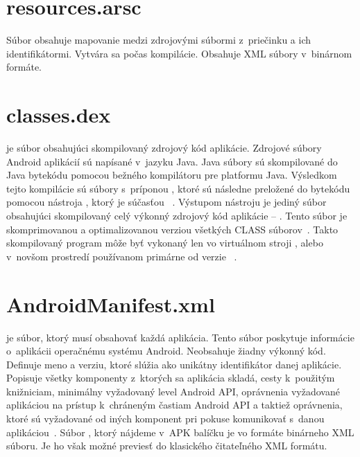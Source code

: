 \section{resources.arsc}
\label{resources.arsc}
Súbor  obsahuje mapovanie medzi zdrojovými súbormi  z~priečinku  a ich identifikátormi.  Vytvára sa počas kompilácie. Obsahuje XML súbory v~binárnom formáte.

\section{classes.dex}
\label{classes.dex}
 je súbor obsahujúci skompilovaný zdrojový kód aplikácie.  Zdrojové súbory Android aplikácií sú napísané v~jazyku Java. Java súbory sú skompilované do Java bytekódu pomocou bežného kompilátoru pre platformu Java. Výsledkom tejto kompilácie sú súbory s~príponou , ktoré sú následne preložené do  bytekódu pomocou nástroja , ktorý je súčasťou ~\cite{Reddy2014}. Výstupom nástroju  je jediný súbor obsahujúci skompilovaný celý výkonný zdrojový kód aplikácie -- . Tento súbor je skomprimovanou a optimalizovanou verziou všetkých CLASS súborov~\cite{Georgiev2014}. Takto skompilovaný program môže byť vykonaný len vo virtuálnom stroji , alebo v~novšom prostredí  používanom primárne od verzie ~\cite{dalvik}.

\section{AndroidManifest.xml} 
\label{AndroidManifest.xml}
 je súbor, ktorý musí obsahovať každá aplikácia. Tento súbor poskytuje informácie o~aplikácii operačnému systému Android. Neobsahuje žiadny výkonný kód. Definuje meno a verziu, ktoré slúžia ako unikátny identifikátor danej aplikácie. Popisuje všetky komponenty z~ktorých sa aplikácia skladá, cesty k~použitým knižniciam, minimálny vyžadovaný level Android API, oprávnenia vyžadované aplikáciou na prístup k~chráneným častiam Android API a taktiež oprávnenia, ktoré sú vyžadované od iných komponent pri pokuse komunikovať s~danou aplikáciou~\cite{appManifest}. Súbor , ktorý nájdeme v~APK balíčku je vo formáte binárneho XML súboru. Je ho však možné previesť do klasického čitateľného XML formátu.

